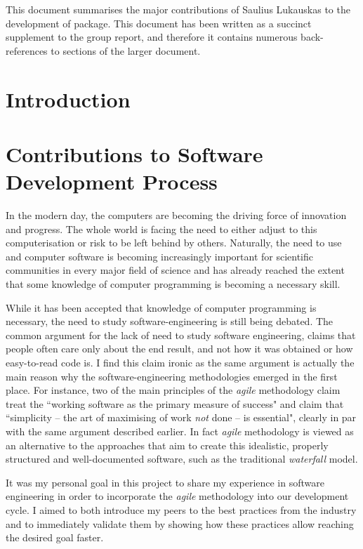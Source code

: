 This document summarises the major contributions of Saulius Lukauskas
to the development of \means{} package.
This document has been written as a succinct supplement to the group report, and therefore it contains numerous back-references to sections of the larger document.

\section{Introduction}

\section{Contributions to Software Development Process}

In the modern day, the computers are becoming the driving force of innovation and progress. 
The whole world is facing the need to either adjust to this computerisation or risk to be left behind by others.
Naturally, the need to use and computer software is becoming increasingly important for scientific communities in every major field of science and has already reached the extent that some knowledge of computer programming is becoming a necessary skill.

While it has been accepted that knowledge of computer programming is necessary, the need to study software-engineering is still being debated. 
The common argument for the lack of need to study software engineering, claims that people often care only about the end result, and not how it was obtained or how easy-to-read code is. 
I find this claim ironic as the same argument is actually the main reason why the software-engineering methodologies emerged in the first place. 
For instance, two of the main principles of the \emph{agile} methodology\cite{_manifesto_????} claim treat the ``working software as the primary measure of success" and claim that ``simplicity -- the art of maximising of work \emph{not} done -- is essential"\cite{paulk_agile_2002}, clearly in par with the same argument described earlier. 
In fact \emph{agile} methodology is viewed as an alternative to the approaches that aim to create this idealistic, properly structured and well-documented software, such as the traditional \emph{waterfall} model.

It was my personal goal in this project to share my experience in software engineering in order to incorporate the \emph{agile} methodology into our development cycle. 
I aimed to both introduce my peers to the best practices from the industry and to immediately validate them by showing how these practices allow reaching the desired goal faster.

